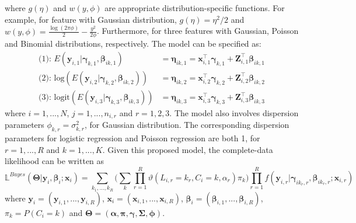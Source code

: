 where $g(\eta)$ and $w(y,\phi)$ are appropriate distribution-specific functions. For example, for feature with Gaussian distribution, $g(\eta) = \eta^2/2$ and $w(y,\phi) = \frac{\log(2\pi\phi)}{2} - \frac{y^2}{2\phi}$. Furthermore, for three features with Gaussian, Poisson and Binomial distributions, respectively. The model can be specified as: 
\begin{align*}
  \text{(1): }  E(\boldsymbol{y}_{i,1}|\boldsymbol{\gamma}_{k,1}, \boldsymbol{\beta}_{ik,1}) & = \boldsymbol{\eta}_{ik,1}  =   \boldsymbol{x}_{i,1}^\top\boldsymbol{\gamma}_{k,1} +  \boldsymbol{Z}_{i,1}^\top\boldsymbol{\beta}_{ik,1}  \\
  \text{(2): }    \text{log}(E(\boldsymbol{y}_{i,2}|\boldsymbol{\gamma}_{k,2}, \boldsymbol{\beta}_{ik,2})) & = \boldsymbol{\eta}_{ik,2}  =  \boldsymbol{x}_{i,2}^\top\boldsymbol{\gamma}_{k,2} +  \boldsymbol{Z}_{i,2}^\top\boldsymbol{\beta}_{ik,2} \\
  \text{(3): }   \text{logit}(E(\boldsymbol{y}_{i,3}|\boldsymbol{\gamma}_{k,3},\boldsymbol{\beta}_{ik,3})) & =  \boldsymbol{\eta}_{ik,3} = \boldsymbol{x}_{i,3}^\top\boldsymbol{\gamma}_{k,3} +  \boldsymbol{Z}_{i,3}^\top\boldsymbol{\beta}_{ik,3}
\end{align*}
where $i=1,...,N$, $j=1,...,n_{i,r}$ and $r=1,2,3$. The model also involves dispersion parameters $\phi_{k,r} = \sigma^2_{k,r}$, for Gaussian distribution.  The corresponding dispersion parameters for logistic regression and Poisson regression are both 1, for $r=1,...,R$ and $k=1,...,K$. Given this proposed model, the complete-data likelihood can be written as
\begin{equation}
 \mathbb{L}^{Bayes}(\boldsymbol{\Theta}| \boldsymbol{y}_i,\boldsymbol{\beta}_i; \boldsymbol{x}_{i})   =  \sum_{k_1,...,k_R}   \bigg(\sum_k \prod_{r=1}^R \vartheta(L_{i,r}=k_r,C_i=k,\alpha_r) \pi_k \bigg)  \prod_{r=1}^R f(\boldsymbol{y}_{i,r}|\boldsymbol{\gamma}_{ik_r,r},\boldsymbol{\beta}_{ik_r,r}; \boldsymbol{x}_{i,r}) 
\end{equation}
where    $\boldsymbol{y}_i = (\boldsymbol{y}_{i,1},...,\boldsymbol{y}_{i,R})$,  $\boldsymbol{x}_i = (\boldsymbol{x}_{i,1},...,\boldsymbol{x}_{i,R})$, $\boldsymbol{\beta}_i = (\boldsymbol{\beta}_{i,1},..., \boldsymbol{\beta}_{i,R})$, $\pi_k=P(C_i = k)$ and $\boldsymbol{\Theta}= (\boldsymbol{\alpha}, \boldsymbol{\pi},\boldsymbol{\gamma},\boldsymbol{\Sigma},\boldsymbol{\phi})$.


